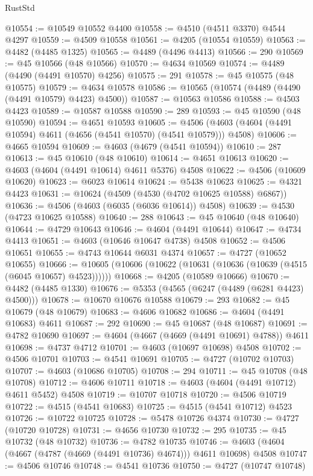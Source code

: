 \begin{lexlean}{RustStd}
\begin{coremodule}
@10554 := @10549 @10552 @4400
@10558 := @4510 (@4511 @3370) @4544 @4297
@10559 := @4509 @10558
@10561 := @4205 (@10554 @10559)
@10563 := @4482 (@4485 @1325)
@10565 := @4489 (@4496 @4413)
@10566 := 290
@10569 := @45 @10566 (@48 @10566)
@10570 := @4634 @10569
@10574 := @4489 (@4490 (@4491 @10570) @4256)
@10575 := 291
@10578 := @45 @10575 (@48 @10575)
@10579 := @4634 @10578
@10586 := @10565 (@10574 (@4489 (@4490 (@4491 @10579) @4423) @4500))
@10587 := @10563 @10586
@10588 := @4503 @4423
@10589 := @10587 @10588
@10590 := 289
@10593 := @45 @10590 (@48 @10590)
@10594 := @4651 @10593
@10605 := @4506 (@4603 (@4604 (@4491 @10594) @4611 (@4656 (@4541 @10570) (@4541 @10579))) @4508)
@10606 := @4665 @10594
@10609 := @4603 (@4679 (@4541 @10594))
@10610 := 287
@10613 := @45 @10610 (@48 @10610)
@10614 := @4651 @10613
@10620 := @4603 (@4604 (@4491 @10614) @4611 @5376) @4508
@10622 := @4506 (@10609 @10620)
@10623 := @6023 @10614
@10624 := @5438 @10623
@10625 := @4321 @4423
@10631 := @10624 (@4509 (@4530 (@4702 @10625 @10588) @6867))
@10636 := @4506 (@4603 (@6035 (@6036 @10614)) @4508)
@10639 := @4530 (@4723 @10625 @10588)
@10640 := 288
@10643 := @45 @10640 (@48 @10640)
@10644 := @4729 @10643
@10646 := @4604 (@4491 @10644)
@10647 := @4734 @4413
@10651 := @4603 (@10646 @10647 @4738) @4508
@10652 := @4506 @10651
@10655 := @4743 @10644 @6031 @4374
@10657 := @4727 (@10652 @10655)
@10666 := @10605 (@10606 (@10622 (@10631 (@10636 (@10639 (@4515 (@6045 @10657) @4523))))))
@10668 := @4205 (@10589 @10666)
@10670 := @4482 (@4485 @1330)
@10676 := @5353 (@4565 (@6247 (@4489 (@6281 @4423) @4500)))
@10678 := @10670 @10676 @10588
@10679 := 293
@10682 := @45 @10679 (@48 @10679)
@10683 := @4606 @10682
@10686 := @4604 (@4491 @10683) @4611
@10687 := 292
@10690 := @45 @10687 (@48 @10687)
@10691 := @4782 @10690
@10697 := @4604 (@4667 (@4669 (@4491 @10691) @4788)) @4611
@10698 := @4737 @4712
@10701 := @4603 (@10697 @10698) @4508
@10702 := @4506 @10701
@10703 := @4541 @10691
@10705 := @4727 (@10702 @10703)
@10707 := @4603 (@10686 @10705)
@10708 := 294
@10711 := @45 @10708 (@48 @10708)
@10712 := @4606 @10711
@10718 := @4603 (@4604 (@4491 @10712) @4611 @5452) @4508
@10719 := @10707 @10718
@10720 := @4506 @10719
@10722 := @4515 (@4541 @10683)
@10725 := @4515 (@4541 @10712) @4523
@10726 := @10722 @10725
@10728 := @5478 @10726 @4374
@10730 := @4727 (@10720 @10728)
@10731 := @4656 @10730
@10732 := 295
@10735 := @45 @10732 (@48 @10732)
@10736 := @4782 @10735
@10746 := @4603 (@4604 (@4667 (@4787 (@4669 (@4491 @10736) @4674))) @4611 @10698) @4508
@10747 := @4506 @10746
@10748 := @4541 @10736
@10750 := @4727 (@10747 @10748)

\end{coremodule}
\end{lexlean}
